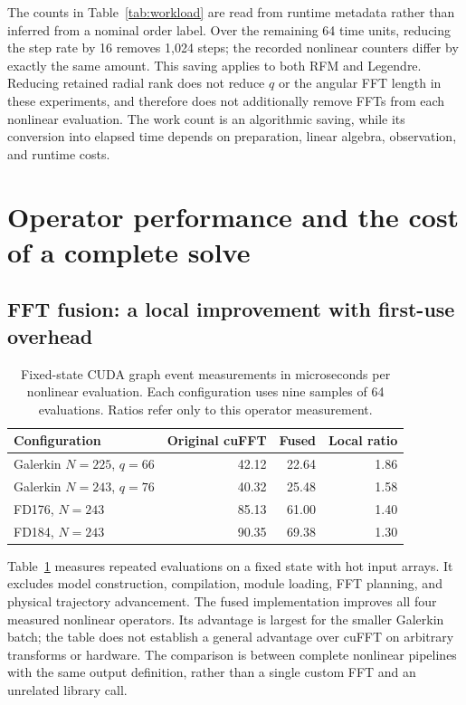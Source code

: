 The counts in Table~\ref{tab:workload} are read from runtime metadata rather than inferred from a nominal order label. Over the remaining 64 time units, reducing the step rate by 16 removes 1,024 steps; the recorded nonlinear counters differ by exactly the same amount. This saving applies to both RFM and Legendre. Reducing retained radial rank does not reduce $q$ or the angular FFT length in these experiments, and therefore does not additionally remove FFTs from each nonlinear evaluation. The work count is an algorithmic saving, while its conversion into elapsed time depends on preparation, linear algebra, observation, and runtime costs.



\section{Operator performance and the cost of a complete solve}
\label{sec:performance-results}

\subsection{FFT fusion: a local improvement with first-use overhead}

\begin{table}[tbp]
\centering\small
\caption{Fixed-state CUDA graph event measurements in microseconds per nonlinear evaluation. Each configuration uses nine samples of 64 evaluations. Ratios refer only to this operator measurement.}
\label{tab:fusion-events}
\begin{tabularx}{\linewidth}{@{}Xrrr@{}}
\toprule
Configuration & Original cuFFT & Fused & Local ratio \\
\midrule
Galerkin $N=225$, $q=66$ & 42.12 & 22.64 & 1.86 \\
Galerkin $N=243$, $q=76$ & 40.32 & 25.48 & 1.58 \\
FD176, $N=243$ & 85.13 & 61.00 & 1.40 \\
FD184, $N=243$ & 90.35 & 69.38 & 1.30 \\
\bottomrule
\end{tabularx}
\end{table}

Table~\ref{tab:fusion-events} measures repeated evaluations on a fixed state with hot input arrays. It excludes model construction, compilation, module loading, FFT planning, and physical trajectory advancement. The fused implementation improves all four measured nonlinear operators. Its advantage is largest for the smaller Galerkin batch; the table does not establish a general advantage over cuFFT on arbitrary transforms or hardware. The comparison is between complete nonlinear pipelines with the same output definition, rather than a single custom FFT and an unrelated library call.

